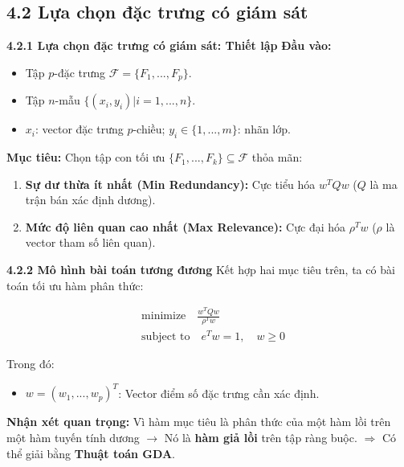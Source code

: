 \subsection{4.2 Lựa chọn đặc trưng có giám sát}
\begin{frame}[t]{\textbf{\large 4.2.1 Lựa chọn đặc trưng có giám sát: Thiết lập}}\vspace*{-1cm}	\textbf{Đầu vào:}
	\begin{itemize}
		\item Tập $p$-đặc trưng $\mathcal{F} = \{F_1, ..., F_p\}$.
		\item Tập $n$-mẫu $\{(x_i, y_i) | i = 1, ..., n\}$.
		\item $x_i$: vector đặc trưng $p$-chiều; $y_i \in \{1, ..., m\}$: nhãn lớp.
	\end{itemize}
	
	\vspace{0.5cm}
	\textbf{Mục tiêu:} Chọn tập con tối ưu $\{F_1, ..., F_k\} \subseteq \mathcal{F}$ thỏa mãn:
	\begin{enumerate}
		\item \textbf{Sự dư thừa ít nhất (Min Redundancy):} Cực tiểu hóa $w^T Q w$ ($Q$ là ma trận bán xác định dương).
		\item \textbf{Mức độ liên quan cao nhất (Max Relevance):} Cực đại hóa $\rho^T w$ ($\rho$ là vector tham số liên quan).
	\end{enumerate}
\end{frame}

\begin{frame}[t]{\textbf{\large 4.2.2 Mô hình bài toán tương đương}}
	Kết hợp hai mục tiêu trên, ta có bài toán tối ưu hàm phân thức:
	
	\begin{equation}
		\label{eq:14}
		\begin{aligned}
			& \text{minimize} \quad \frac{w^T Q w}{\rho^T w} \\
			& \text{subject to} \quad e^T w = 1, \quad w \geq 0
		\end{aligned}
	\end{equation}
	
	Trong đó:
	\begin{itemize}
		\item $w = (w_1, ..., w_p)^T$: Vector điểm số đặc trưng cần xác định.
	\end{itemize}
	
	\vspace{0.5cm}
	\textbf{Nhận xét quan trọng:}
	Vì hàm mục tiêu là phân thức của một hàm lồi trên một hàm tuyến tính dương $\rightarrow$ Nó là \textbf{hàm giả lồi} trên tập ràng buộc.
	$\Rightarrow$ Có thể giải bằng \textbf{Thuật toán GDA}.
\end{frame}

